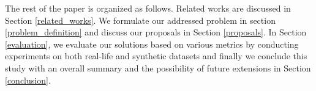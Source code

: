 The rest of the paper is organized as follows. Related works are discussed in Section \ref{related_works}. We formulate our addressed problem in section \ref{problem_definition} and discuss our proposals in Section \ref{proposals}. In Section \ref{evaluation}, we evaluate our solutions based on various metrics by conducting experiments on both real-life and synthetic datasets and finally we conclude this study with an overall summary and the possibility of future extensions in Section \ref{conclusion}. 




%
%



